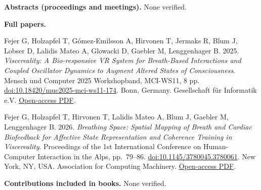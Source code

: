 \textbf{Abstracts (proceedings and meetings).} None verified.

\textbf{Full papers.}

Fejer G, Holzapfel T, G\'omez-Emilsson A, Hirvonen T, Jermaks R, Blum J, Lobser D, Lalidis Mateo A, Glowacki D, Gaebler M, Lenggenhager B. 2025. \emph{Viscereality: A Bio-responsive VR System for Breath-Based Interactions and Coupled Oscillator Dynamics to Augment Altered States of Consciousness}. Mensch und Computer 2025 Workshopband, MCI-WS11, 8 pp. \href{https://doi.org/10.18420/muc2025-mci-ws11-174}{doi:10.18420/muc2025-mci-ws11-174}. Bonn, Germany. Gesellschaft f\"ur Informatik e.V. \href{https://www.hsbi.de/publikationsserver/download/6574/6575/muc-2025-mci-174.pdf}{Open-access PDF}.

Fejer G, Holzapfel T, Hirvonen T, Lalidis Mateo A, Blum J, Gaebler M, Lenggenhager B. 2026. \emph{Breathing Space: Spatial Mapping of Breath and Cardiac Biofeedback for Affective State Representation and Coherence Training in Viscereality}. Proceedings of the 1st International Conference on Human-Computer Interaction in the Alps, pp.~79--86. \href{https://doi.org/10.1145/3780045.3780061}{doi:10.1145/3780045.3780061}. New York, NY, USA. Association for Computing Machinery. \href{https://www.hsbi.de/publikationsserver/download/7162/7163/3780045.3780061.pdf}{Open-access PDF}.

\textbf{Contributions included in books.} None verified.
